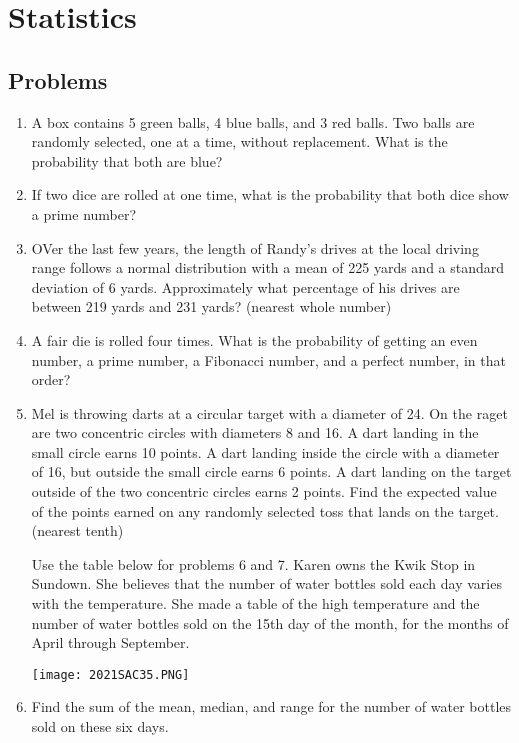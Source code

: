 \documentclass[../uilmath.tex]{subfiles}
\begin{document}
\chapter{Statistics}
\section*{Problems}
\begin{enumerate}[label=\bfseries\arabic*.]
    \item %
    A box contains 5 green balls, 4 blue balls, and 3 red balls. Two balls are randomly selected, one at a time, without replacement. What is the probability that both are blue?

    \item %
    If two dice are rolled at one time, what is the probability that both dice show a prime number?

    \item %
    OVer the last few years, the length of Randy's drives at the local driving range follows a normal distribution with a mean of 
    225 yards and a standard deviation of 6 yards. Approximately what percentage of his drives are between 219 yards and 231 yards? (nearest whole number)

    \item %
    A fair die is rolled four times. What is the probability of getting an even number, a prime number, a Fibonacci number, and a perfect number, in that order?

    \item %
    Mel is throwing darts at a circular target with a diameter of 24. On the raget are two concentric circles with diameters 8 and 16. A dart landing in the small circle earns 10 points.
    A dart landing inside the circle with a diameter of 16, but outside the small circle earns 6 points. A dart landing on the target outside of the two concentric circles earns 2 points.
    Find the expected value of the points earned on any randomly selected toss that lands on the target. (nearest tenth)


    Use the table below for problems 6 and 7. Karen owns the Kwik Stop in Sundown. She believes that the number of water bottles sold each day 
    varies with the temperature. She made a table of the high temperature and the number of water bottles sold on the 15th day of the month, for the months of April through September.
    \begin{center}
        \texttt{[image: 2021SAC35.PNG]}
    \end{center}
    \item %
    Find the sum of the mean, median, and range for the number of water bottles sold on these six days.


\end{enumerate}
\end{document}

